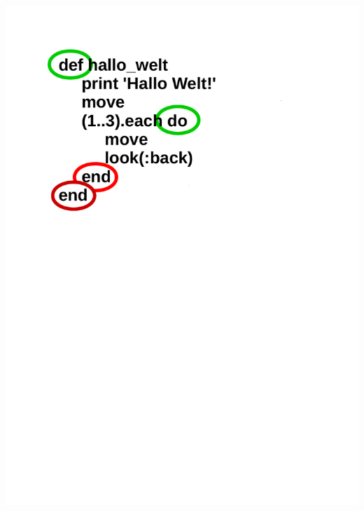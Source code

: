 \begin{frame}

	\begin{center}
		\includegraphics[scale=0.4]{scopes/beispiel2.pdf}
	\end{center}
\end{frame}

